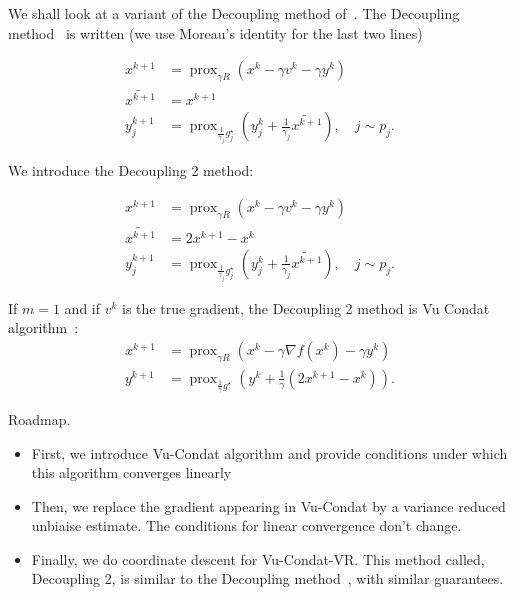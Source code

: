 \documentclass{article}
\newcommand{\adil}[1]{\todo[inline]{\textbf{Adil: }#1}}
\DeclareMathOperator{\prox}{prox}
\theoremstyle{definition}
\begin{document}
We shall look at a variant of the Decoupling method of~\cite{mishchenko2019stochastic}.
The Decoupling method~\cite{mishchenko2019stochastic} is written (we use Moreau's identity for the last two lines)

\begin{align}
    x^{k+1}   &= \prox_{\gamma R}(x^k - \gamma v^k - \gamma y^k)\\
    \widetilde{x^{k+1}} &= x^{k+1}\\
    y_j^{k+1} &= \prox_{\frac{1}{\gamma_j} g_j^\star}(y_j^k + \frac{1}{\gamma_j}\widetilde{x^{k+1}} ), \quad j \sim p_j.
\end{align}

We introduce the Decoupling 2 method:

\begin{align}
    x^{k+1}   &= \prox_{\gamma R}(x^k - \gamma v^k - \gamma y^k)\\
    \widetilde{x^{k+1}} &= 2x^{k+1} - x^k\\
    y_j^{k+1} &= \prox_{\frac{1}{\gamma_j} g_j^\star}(y_j^k + \frac{1}{\gamma_j}\widetilde{x^{k+1}} ), \quad j \sim p_j.
\end{align}

If $m=1$ and if $v^k$ is the true gradient, the Decoupling 2 method is Vu Condat algorithm~\cite{con-jota13}:
\begin{align}
    x^{k+1}   &= \prox_{\gamma R}(x^k - \gamma \nabla f(x^k) - \gamma y^k)\\
    y^{k+1} &= \prox_{\frac{1}{\gamma} g^\star}(y^k + \frac{1}{\gamma}(2x^{k+1}-x^k)).
\end{align}



Roadmap.
\begin{itemize}
    \item First, we introduce Vu-Condat algorithm and provide conditions under which this algorithm converges linearly
    \item Then, we replace the gradient appearing in Vu-Condat by a variance reduced unbiaise estimate. The conditions for linear convergence don't change.
    \item Finally, we do coordinate descent for Vu-Condat-VR. This method called, Decoupling 2, is similar to the Decoupling method~\cite{mishchenko2019stochastic}, with similar guarantees. 
\end{itemize}
\end{document}
